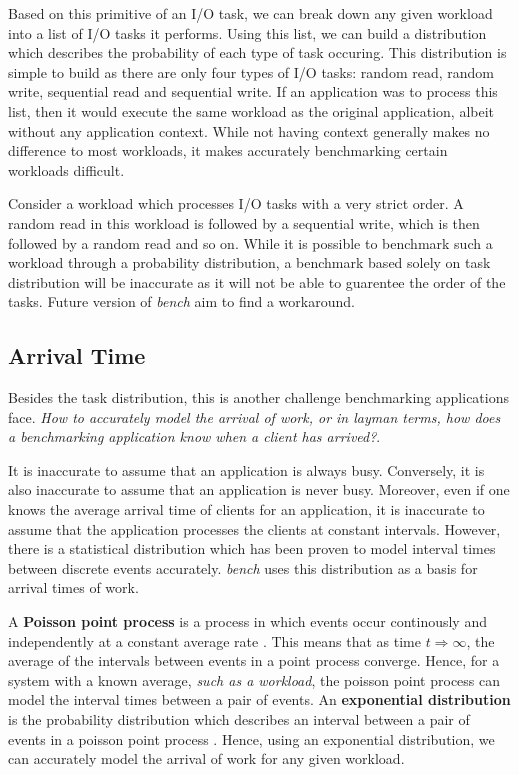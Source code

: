 \documentclass[10pt, author, twocolumn]{article}
\begin{document}
Based on this primitive of an I/O task, we can break down any given workload into a list of I/O tasks it performs. Using this list, we can build a distribution which describes the probability of each type of task occuring. This distribution is simple to build as there are only four types of I/O tasks: random read, random write, sequential read and sequential write. If an application was to process this list, then it would execute the same workload as the original application, albeit without any application context. While not having context generally makes no difference to most workloads, it makes accurately benchmarking certain workloads difficult.

Consider a workload which processes I/O tasks with a very strict order. A random read in this workload is followed by a sequential write, which is then followed by a random read and so on. While it is possible to benchmark such a workload through a probability distribution, a benchmark based solely on task distribution will be inaccurate as it will not be able to guarentee the order of the tasks. Future version of \textit{bench} aim to find a workaround.

\subsection{Arrival Time}
Besides the task distribution, this is another challenge benchmarking applications face. \textit{How to accurately model the arrival of work, or in layman terms, how does a benchmarking application know when a client has arrived?}. 

It is inaccurate to assume that an application is always busy. Conversely, it is also inaccurate to assume that an application is never busy. Moreover, even if one knows the average arrival time of clients for an application, it is inaccurate to assume that the application processes the clients at constant intervals. However, there is a statistical distribution which has been proven to model interval times between discrete events accurately. \textit{bench} uses this distribution as a basis for arrival times of work. 

A \textbf{Poisson point process} is a process in which events occur continously and independently at a constant average rate \cite{}. This means that as time $t \Rightarrow \infty$, the average of the intervals between events in a point process converge. Hence, for a system with a known average, \textit{such as a workload}, the poisson point process can model the interval times between a pair of events. An \textbf{exponential distribution} is the probability distribution which describes an interval between a pair of events in a poisson point process \cite{}. Hence, using an exponential distribution, we can accurately model the arrival of work for any given workload.
\end{document}
